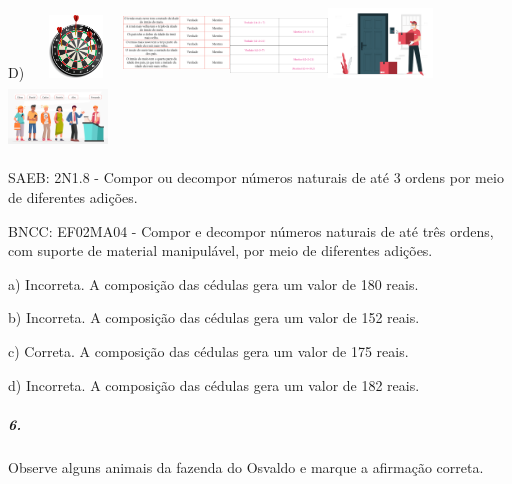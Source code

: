 D)
\includegraphics[width=0.98131in,height=0.65625in]{media/image108.png}\includegraphics[width=1.10972in,height=0.74212in]{media/image109.png}\includegraphics[width=1.02736in,height=0.68704in]{media/image110.png}\includegraphics[width=1.09268in,height=0.73073in]{media/image112.png}\includegraphics[width=1.04264in,height=0.69727in]{media/image113.png}

SAEB: 2N1.8 - Compor ou decompor números naturais de até 3 ordens por
meio de diferentes adições.

BNCC: EF02MA04 - Compor e decompor números naturais de até três ordens,
com suporte de material manipulável, por meio de diferentes adições.

a) Incorreta. A composição das cédulas gera um valor de 180 reais.

b) Incorreta. A composição das cédulas gera um valor de 152 reais.

c) Correta. A composição das cédulas gera um valor de 175 reais.

d) Incorreta. A composição das cédulas gera um valor de 182 reais.

\subparagraph{6. }\label{section-105}

Observe alguns animais da fazenda do Osvaldo e marque a afirmação
correta.

